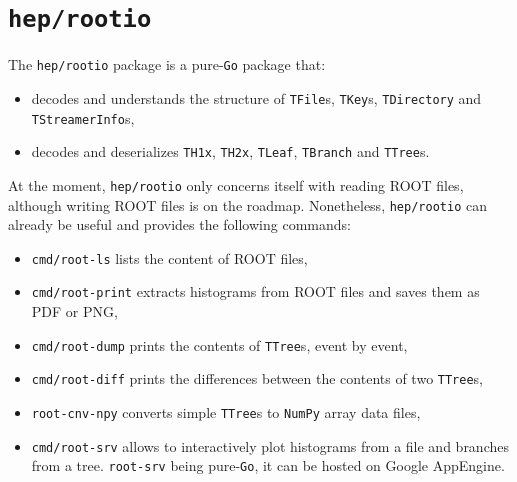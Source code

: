 \documentclass[a4paper]{jpconf}
\begin{document}
\section{\texttt{hep/rootio}}
The \texttt{hep/rootio} package is a pure-\texttt{Go} package that:
\begin{itemize}
\item decodes and understands the structure of \texttt{TFile}s, \texttt{TKey}s, \texttt{TDirectory} and \texttt{TStreamerInfo}s,
\item decodes and deserializes \texttt{TH1x}, \texttt{TH2x}, \texttt{TLeaf}, \texttt{TBranch} and \texttt{TTree}s. 
\end{itemize}
At the moment, \texttt{hep/rootio} only concerns itself with reading ROOT files, although writing ROOT files is on the roadmap.
Nonetheless, \texttt{hep/rootio} can already be useful and provides the following commands:
\begin{itemize}
	\item \texttt{cmd/root-ls} lists the content of ROOT files,
	\item \texttt{cmd/root-print} extracts histograms from ROOT files and saves them as PDF or PNG,
	\item \texttt{cmd/root-dump} prints the contents of \texttt{TTree}s, event by event,
	\item \texttt{cmd/root-diff} prints the differences between the contents of two \texttt{TTree}s,
	\item \texttt{root-cnv-npy} converts simple \texttt{TTree}s to \texttt{NumPy} array data files,
	\item \texttt{cmd/root-srv} allows to interactively plot histograms from a file and branches from a tree. \texttt{root-srv} being pure-\texttt{Go}, it can be hosted on Google AppEngine.
\end{itemize}
\end{document}
